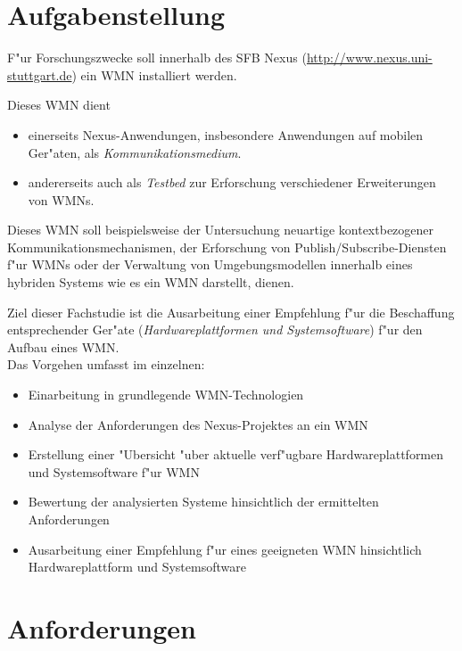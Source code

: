 \section{Aufgabenstellung}

F"ur Forschungszwecke soll innerhalb des SFB Nexus
(\url{http://www.nexus.uni-stuttgart.de}) 
ein WMN installiert werden. 

Dieses WMN dient 
\begin{itemize}
	\item einerseits Nexus-Anwendungen, insbesondere Anwendungen 
	auf mobilen Ger"aten, als \emph{Kommunikationsmedium}. 

	\item andererseits auch als \emph{Testbed} 
	zur Erforschung verschiedener Erweiterungen von WMNs.
\end{itemize}

Dieses WMN soll beispielsweise der Untersuchung neuartige kontextbezogener 
Kommunikationsmechanismen, der Erforschung von 
Publish/Subscribe-Diensten f"ur WMNs oder der 
Verwaltung von Umgebungsmodellen innerhalb eines 
hybriden Systems wie es ein WMN darstellt, dienen.

Ziel dieser Fachstudie ist die Ausarbeitung einer 
Empfehlung f"ur die Beschaffung entsprechender Ger"ate 
(\emph{Hardwareplattformen und Systemsoftware}) f"ur
den Aufbau eines WMN. \\

Das Vorgehen umfasst im einzelnen:

\begin{itemize}
	
	\item Einarbeitung in grundlegende WMN-Technologien
	\item Analyse der Anforderungen des Nexus-Projektes an ein WMN
	\item Erstellung einer "Ubersicht "uber aktuelle verf"ugbare 
	Hardwareplattformen und Systemsoftware f"ur WMN
	\item Bewertung der analysierten Systeme hinsichtlich 
	der ermittelten Anforderungen 	
	\item Ausarbeitung einer Empfehlung f"ur eines geeigneten 
	WMN hinsichtlich Hardwareplattform und Systemsoftware
	
\end{itemize}


\section{Anforderungen}

